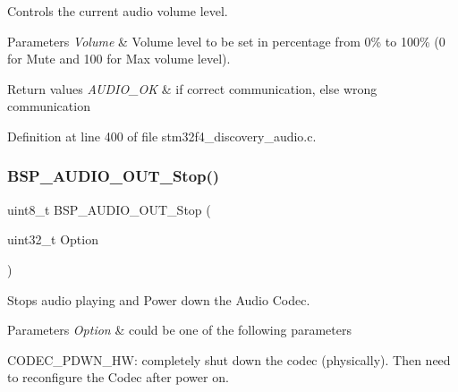 Controls the current audio volume level. 


\begin{DoxyParams}{Parameters}
{\em Volume} & Volume level to be set in percentage from 0\% to 100\% (0 for Mute and 100 for Max volume level). \\
\hline
\end{DoxyParams}

\begin{DoxyRetVals}{Return values}
{\em A\+U\+D\+I\+O\+\_\+\+OK} & if correct communication, else wrong communication \\
\hline
\end{DoxyRetVals}


Definition at line 400 of file stm32f4\+\_\+discovery\+\_\+audio.\+c.

\mbox{\label{group___s_t_m32_f4___d_i_s_c_o_v_e_r_y___a_u_d_i_o___o_u_t___private___functions_gad1a2df4f21ae348be27cecff63dfca1c}} 
\subsubsection{\texorpdfstring{B\+S\+P\+\_\+\+A\+U\+D\+I\+O\+\_\+\+O\+U\+T\+\_\+\+Stop()}{BSP\_AUDIO\_OUT\_Stop()}}
{\footnotesize\ttfamily uint8\+\_\+t B\+S\+P\+\_\+\+A\+U\+D\+I\+O\+\_\+\+O\+U\+T\+\_\+\+Stop (\begin{DoxyParamCaption}\item[{uint32\+\_\+t}]{Option }\end{DoxyParamCaption})}



Stops audio playing and Power down the Audio Codec. 


\begin{DoxyParams}{Parameters}
{\em Option} & could be one of the following parameters
\begin{DoxyItemize}
\item C\+O\+D\+E\+C\+\_\+\+P\+D\+W\+N\+\_\+\+HW\+: completely shut down the codec (physically). Then need to reconfigure the Codec after power on. ~\newline

\end{DoxyItemize}\\
\hline
\end{DoxyParams}

